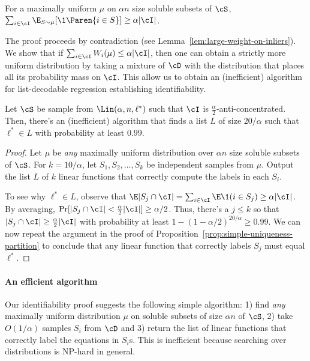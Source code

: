 \begin{proposition} \label{prop:fair-weight}
For a maximally uniform $\mu$ on $\alpha n$ size soluble subsets of $\cS$, $\sum_{i \in \cI} \E_{S \sim \mu} [\1 \Paren{i \in S}] \geq \alpha |\cI|$. 
\end{proposition}
The proof proceeds by contradiction (see Lemma~\ref{lem:large-weight-on-inliers}). We show that if $\sum_{i \in \cI} W_i(\mu) \leq \alpha |\cI|$, then one can obtain a strictly more uniform distribution by taking a mixture of $\cD$ with the distribution that places all its probability mass on $\cI$. This allow us to obtain an (inefficient) algorithm for list-decodable regression establishing identifiability. 
\begin{proposition} \label{prop:identifiability}
Let $\cS$ be sample from $\Lin(\alpha, n,\ell^*)$ such that $\cI$ is $\frac{\alpha}{2}$-anti-concentrated. Then, there's an (inefficient) algorithm that finds a list $L$ of size $20/\alpha$ such that $\ell^* \in L$ with probability at least $0.99$.
\end{proposition}
\begin{proof}
Let $\mu$ be \emph{any} maximally uniform distribution over $\alpha n$ size soluble subsets of $\cS$. 
For $k = 10/\alpha$, let $S_1, S_2, \ldots, S_k$ be independent samples from $\mu$.
Output the list $L$ of $k$ linear functions that correctly compute the labels in each $S_i$.

To see why $\ell^* \in L$, observe that $\E |S_j \cap \cI|= \sum_{i \in \cI} \E \1(i \in S_j) \geq \alpha |\cI|$. 
By averaging, $\Pr [|S_j \cap \cI| < \frac{\alpha}{2} |\cI|] \geq \alpha/2$. Thus, there's  a $j \leq k$ so that $|S_j \cap \cI| \geq \frac{\alpha}{2} |\cI|$ with probability at least $1-(1-\alpha/2)^{20/\alpha} \geq 0.99$. We can now repeat the argument in the proof of Proposition~\ref{prop:simple-uniqueness-partition} to conclude that any linear function that correctly labels $S_j$ must equal $\ell^*$.
\end{proof}


\paragraph{An efficient algorithm}
Our identifiability proof suggests the following simple algorithm: 1) find \emph{any} maximally uniform distribution $\mu$ on soluble subsets of size $\alpha n$ of $\cS$, 2) take $O(1/\alpha)$ samples $S_i$ from $\cD$ and 3) return the list of linear functions that correctly label the equations in $S_i$s. This is inefficient because searching over distributions is NP-hard in general. 

